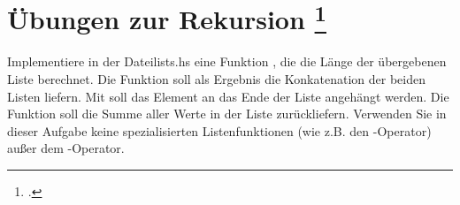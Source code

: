 \documentclass{lehramt-informatik-aufgabe}
\begin{document}
\section{Übungen zur Rekursion
\footcite{fumup:ab:3}}

Implementiere in der Dateilists.hs eine Funktion
, die die Länge der übergebenen Liste
berechnet. Die Funktion  soll
als Ergebnis die Konkatenation der beiden Listen liefern. Mit
 soll das Element an das Ende der
Liste angehängt werden. Die Funktion  soll
die Summe aller Werte in der Liste zurückliefern. Verwenden Sie in
dieser Aufgabe keine spezialisierten Listenfunktionen (wie z.B. den
\liHaskellCode{++}-Operator) außer dem \liHaskellCode{:}-Operator.

\begin{liAntwort}
\end{liAntwort}
\end{document}
